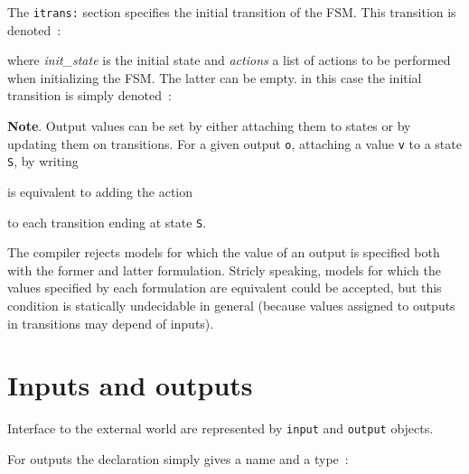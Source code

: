 The \verb|itrans:| section specifies the initial transition of the FSM. This transition is denoted~:

\begin{center}
\end{center}

where \emph{init\_state} is the initial state and \emph{actions} a list of actions to be performed
when initializing the FSM. The latter can be empty. in this case the initial transition is simply
denoted~:

\begin{center}
\end{center}

\medskip
\textbf{Note}. Output values can be set by either attaching them to states or by updating them on
transitions. For a given output \texttt{o}, attaching a value \texttt{v} to a state \texttt{S}, by writing

\begin{center}
\end{center}

is equivalent to adding the action

\begin{center}
\end{center}

to each transition ending at state \texttt{S}.

The compiler rejects models for which the value of an output is specified both with the former and
latter formulation. Stricly speaking, models for which the values specified by each formulation are
equivalent could be accepted, but this condition is statically undecidable in general (because
values assigned to outputs in transitions may depend of inputs).


\section{Inputs and outputs}
\label{sec:inputs-outputs}

Interface to the external world are represented by \verb|input| and \verb|output| objects.

\step For outputs the declaration simply gives a name and a type~:

\begin{center}
\end{center}

